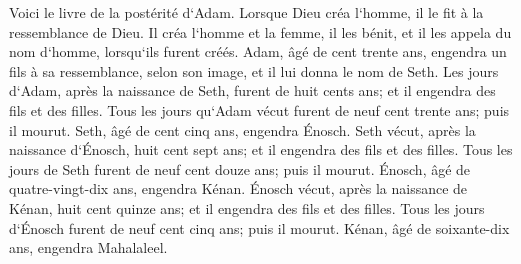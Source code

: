 \verse Voici le livre de la postérité d`Adam. Lorsque Dieu créa l`homme, il le fit à la ressemblance de Dieu. 
\verse Il créa l`homme et la femme, il les bénit, et il les appela du nom d`homme, lorsqu`ils furent créés. 
\verse Adam, âgé de cent trente ans, engendra un fils à sa ressemblance, selon son image, et il lui donna le nom de Seth. 
\verse Les jours d`Adam, après la naissance de Seth, furent de huit cents ans; et il engendra des fils et des filles. 
\verse Tous les jours qu`Adam vécut furent de neuf cent trente ans; puis il mourut. 
\verse Seth, âgé de cent cinq ans, engendra Énosch. 
\verse Seth vécut, après la naissance d`Énosch, huit cent sept ans; et il engendra des fils et des filles. 
\verse Tous les jours de Seth furent de neuf cent douze ans; puis il mourut. 
\verse Énosch, âgé de quatre-vingt-dix ans, engendra Kénan. 
\verse Énosch vécut, après la naissance de Kénan, huit cent quinze ans; et il engendra des fils et des filles. 
\verse Tous les jours d`Énosch furent de neuf cent cinq ans; puis il mourut. 
\verse Kénan, âgé de soixante-dix ans, engendra Mahalaleel. 
